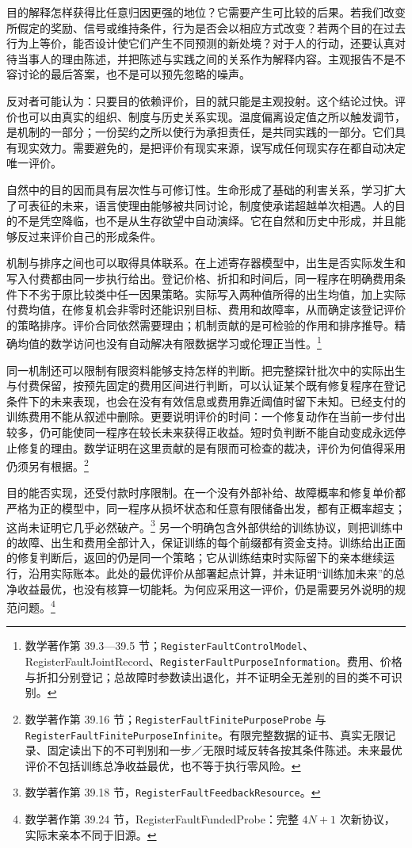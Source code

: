 \documentclass[
  11pt,
  oneside]{book}
\begin{document}
目的解释怎样获得比任意归因更强的地位？它需要产生可比较的后果。若我们改变所假定的奖励、信号或维持条件，行为是否会以相应方式改变？若两个目的在过去行为上等价，能否设计使它们产生不同预测的新处境？对于人的行动，还要认真对待当事人的理由陈述，并把陈述与实践之间的关系作为解释内容。主观报告不是不容讨论的最后答案，也不是可以预先忽略的噪声。

反对者可能认为：只要目的依赖评价，目的就只能是主观投射。这个结论过快。评价也可以由真实的组织、制度与历史关系实现。温度偏离设定值之所以触发调节，是机制的一部分；一份契约之所以使行为承担责任，是共同实践的一部分。它们具有现实效力。需要避免的，是把评价有现实来源，误写成任何现实存在都自动决定唯一评价。

自然中的目的因而具有层次性与可修订性。生命形成了基础的利害关系，学习扩大了可表征的未来，语言使理由能够被共同讨论，制度使承诺超越单次相遇。人的目的不是凭空降临，也不是从生存欲望中自动演绎。它在自然和历史中形成，并且能够反过来评价自己的形成条件。

机制与排序之间也可以取得具体联系。在上述寄存器模型中，出生是否实际发生和写入付费都由同一步执行给出。登记价格、折扣和时间后，同一程序在明确费用条件下不劣于原比较类中任一因果策略。实际写入两种值所得的出生均值，加上实际付费均值，在修复机会非零时还能识别目标、费用和故障率，从而确定该登记评价的策略排序。评价合同依然需要理由；机制贡献的是可检验的作用和排序推导。精确均值的数学访问也没有自动解决有限数据学习或伦理正当性。\footnote{\hypertarget{ph-note-30}{}数学著作第 39.3---39.5 节；\nolinkurl{RegisterFaultControlModel}、RegisterFaultJointRecord、\nolinkurl{RegisterFaultPurposeInformation}。费用、价格与折扣分别登记；总故障时参数读出退化，并不证明全无差别的目的类不可识别。}

同一机制还可以限制有限资料能够支持怎样的判断。把完整探针批次中的实际出生与付费保留，按预先固定的费用区间进行判断，可以认证某个既有修复程序在登记条件下的未来表现，也会在没有有效信息或费用靠近阈值时留下未知。已经支付的训练费用不能从叙述中删除。更要说明评价的时间：一个修复动作在当前一步付出较多，仍可能使同一程序在较长未来获得正收益。短时负判断不能自动变成永远停止修复的理由。数学证明在这里贡献的是有限而可检查的裁决，评价为何值得采用仍须另有根据。\footnote{\hypertarget{ph-note-31}{}数学著作第 39.16 节；\nolinkurl{RegisterFaultFinitePurposeProbe} 与 \nolinkurl{RegisterFaultFinitePurposeInfinite}。有限完整数据的证书、真实无限记录、固定读出下的不可判别和一步／无限时域反转各按其条件陈述。未来最优评价不包括训练总净收益最优，也不等于执行零风险。}

目的能否实现，还受付款时序限制。在一个没有外部补给、故障概率和修复单价都严格为正的模型中，同一程序从损坏状态和任意有限储备出发，都有正概率超支；这尚未证明它几乎必然破产。\footnote{\hypertarget{ph-note-32}{}数学著作第 39.18 节，\nolinkurl{RegisterFaultFeedbackResource}。} 另一个明确包含外部供给的训练协议，则把训练中的故障、出生和费用全部计入，保证训练的每个前缀都有资金支持。训练给出正面的修复判断后，返回的仍是同一个策略；它从训练结束时实际留下的亲本继续运行，沿用实际账本。此处的最优评价从部署起点计算，并未证明``训练加未来''的总净收益最优，也没有核算一切能耗。为何应采用这一评价，仍是需要另外说明的规范问题。\footnote{\hypertarget{ph-note-33}{}数学著作第 39.24 节，RegisterFaultFundedProbe：完整 \(4N+1\) 次新协议，实际末亲本不同于旧源。}
\end{document}
